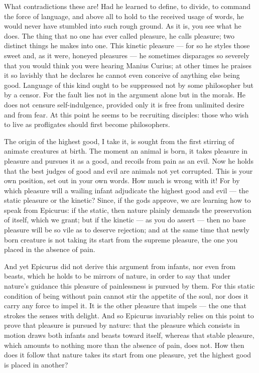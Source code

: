 What contradictions these are! Had he learned to define, to divide, to command the force of language, and above all to hold to the received usage of words, he would never have stumbled into such rough ground. As it is, you see what he does. The thing that no one has ever called pleasure, he calls pleasure; two distinct things he makes into one. This kinetic pleasure — for so he styles those sweet and, as it were, honeyed pleasures — he sometimes disparages so severely that you would think you were hearing Manius Curius; at other times he praises it so lavishly that he declares he cannot even conceive of anything else being good. Language of this kind ought to be suppressed not by some philosopher but by a censor. For the fault lies not in the argument alone but in the morals. He does not censure self-indulgence, provided only it is free from unlimited desire and from fear. At this point he seems to be recruiting disciples: those who wish to live as profligates should first become philosophers.

 The origin of the highest good, I take it, is sought from the first stirring of animate creatures at birth. The moment an animal is born, it takes pleasure in pleasure and pursues it as a good, and recoils from pain as an evil. Now he holds that the best judges of good and evil are animals not yet corrupted. This is your own position, set out in your own words. How much is wrong with it! For by which pleasure will a wailing infant adjudicate the highest good and evil — the static pleasure or the kinetic? Since, if the gods approve, we are learning how to speak from Epicurus: if the static, then nature plainly demands the preservation of itself, which we grant; but if the kinetic — as you do assert — then no base pleasure will be so vile as to deserve rejection; and at the same time that newly born creature is not taking its start from the supreme pleasure, the one you placed in the absence of pain.

 And yet Epicurus did not derive this argument from infants, nor even from beasts, which he holds to be mirrors of nature, in order to say that under nature's guidance this pleasure of painlessness is pursued by them. For this static condition of being without pain cannot stir the appetite of the soul, nor does it carry any force to impel it. It is the other pleasure that impels — the one that strokes the senses with delight. And so Epicurus invariably relies on this point to prove that pleasure is pursued by nature: that the pleasure which consists in motion draws both infants and beasts toward itself, whereas that stable pleasure, which amounts to nothing more than the absence of pain, does not. How then does it follow that nature takes its start from one pleasure, yet the highest good is placed in another?

